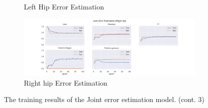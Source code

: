 \begin{figure}
\begin{subfigure}[b]{0.47\linewidth}
      \caption{Left Hip Error Estimation}
      \label{fig:lehi_jt_ee}
  \end{subfigure}
  \hfill
  \begin{subfigure}[b]{0.47\linewidth}
      \centering
      \includegraphics[width=\textwidth]{figures/Results/jt/JointErrorEstimation_Right hip.png}
      \caption{Right hip Error Estimation}
      \label{fig:rihi_jt_ee}
  \end{subfigure}
  \caption[Joint model training results]{The training results of the Joint error estimation model. (cont. 3)}
\end{figure}


